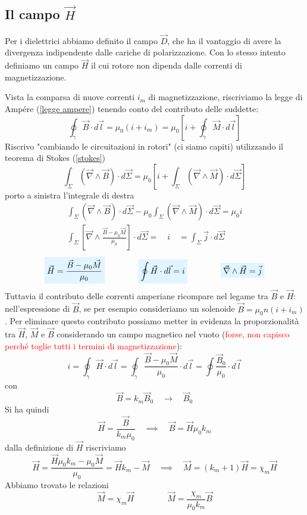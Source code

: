 \documentclass[x11names]{report}
\newcommand{\viola}[1]{%
	\colorbox{myblue}{$\displaystyle #1$}
}
\begin{document}
\subsection{Il campo \(\vec{H}\)}
Per i dielettrici abbiamo definito il campo \(\vec{D}\), che ha il vantaggio di avere la divergenza indipendente dalle cariche di polarizzazione. Con lo stesso intento definiamo un campo \(\vec{H}\) il cui rotore non dipenda dalle correnti di magnetizzazione.

Vista la comparsa di nuove correnti \(i_m\) di magnetizzazione, riscriviamo la legge di Ampére (\ref{legge ampere}) tenendo conto del contributo delle suddette:
\[
\oint_\gamma \vec{B}\cdot d\vec{l} = \mu_0(i+i_m) = \mu_0\left[i + \oint_\gamma \vec{M}\cdot d\vec{l}\right]
\]
Riscrivo "cambiando le circuitazioni in rotori" (ci siamo capiti) utilizzando il teorema di Stokes (\ref{stokes}) 
\[
\int_\Sigma \left(\vec{\nabla}\wedge\vec{B}\right)\cdot d\vec{\Sigma}  =  \mu_0\left[i + \int_\Sigma\left(\vec{\nabla}\wedge\vec{M}\right)\cdot d\vec{\Sigma}\right]
\]
porto a sinistra l'integrale di destra 
\begin{gather*}
	\int_\Sigma \left(\vec{\nabla}\wedge\vec{B}\right)\cdot d\vec{\Sigma} - \mu_0\int_\Sigma\left(\vec{\nabla}\wedge\vec{M}\right)\cdot d\vec{\Sigma} = \mu_0 i \\
	\int_\Sigma \left[\vec{\nabla}\wedge \frac{\vec{B}-\mu_0\vec{M}}{\mu_0}\right] \cdot d\vec{\Sigma} = \quad i \quad = \int_\Sigma \vec{j} \cdot d\vec{\Sigma}
\end{gather*}
\begin{equation}
		\viola{\vec{H} = \frac{\vec{B}-\mu_0\vec{M}}{\mu_0}} \qquad \qquad \viola{\oint \vec{H} \cdot d\vec{l} = i} \qquad \qquad \viola{\vec{\nabla} \wedge \vec{H} = \vec{j}}
\end{equation}
Tuttavia il contributo delle correnti amperiane ricompare nel legame tra \(\vec{B}\) e \(\vec{H}\): nell'espressione di \(\vec{B}\), se per esempio consideriamo un solenoide \(\vec{B} = \mu_0n(i + i_m)\). Per eliminare questo contributo possiamo metter in evidenza la proporzionalità tra \(\vec{H}\), \(\vec{M}\) e \(\vec{B}\) considerando un campo magnetico nel vuoto (\textcolor{red}{forse, non capisco perché toglie tutti i termini di magnetizzazione}):
\[
i = \oint_\gamma \vec{H} \cdot d\vec{l} = \oint_\gamma \frac{\vec{B} - \mu_0 \vec{M}}{\mu_0} \cdot d\vec{l} = \oint \frac{\vec{B}_0}{\mu_0} \cdot d\vec{l}
\]
con 
\[
\vec{B} = k_m\vec{B}_0  \quad \to \quad \vec{B}_0
\]
Si ha quindi
\[
\vec{H} = \frac{\vec{B}}{k_m\mu_0} \quad \implies \quad \boxed{\vec{B} = \vec{H}\mu_0 k_m}
\]
dalla definizione di \(\vec{H}\) riscriviamo
\[
\vec{H} = \frac{\vec{H}\mu_0 k_m - \mu_0 \vec{M}}{\mu_0} = \vec{H} k_m - \vec{M} \quad \implies \quad \vec{M} = (k_m + 1)\vec{H} = \chi_m \vec{H}
\]
Abbiamo trovato le relazioni
\[
\boxed{\vec{M} = \chi_m \vec{H}} \qquad \qquad\boxed{\vec{M} = \frac{\chi_m}{\mu_0 k_m}\vec{B}}
\]
\end{document}

